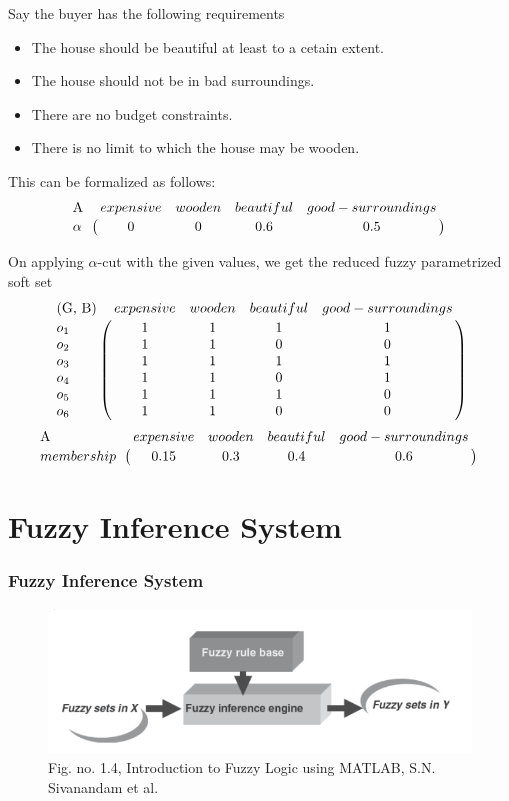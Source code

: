 \documentclass{beamer}
\begin{document}
  \begin{frame}
    Say the buyer has the following requirements
  \begin{itemize}
    \item The house should be beautiful at least to a cetain extent.
    \item The house should not be in bad surroundings.
    \item There are no budget constraints.
    \item There is no limit to which the house may be wooden.
  \end{itemize}
  This can be formalized as follows: 
  $$\bordermatrix{
  \text{A} &  expensive & wooden & beautiful & good-surroundings\cr
  \alpha & 0 & 0 & 0.6 & 0.5 }$$
  \end{frame}
  
  \begin{frame}
  On applying $\alpha$-cut with the given values, we get the reduced fuzzy parametrized soft set
  $$\bordermatrix{
  \text{(G, B)} & expensive & wooden & beautiful & good-surroundings \cr
  o_1 & 1 & 1 & 1 & 1 \cr
  o_2 &1 & 1 & 0 & 0 \cr
  o_3 &1 & 1 & 1 & 1 \cr
  o_4 &1 & 1 & 0 & 1 \cr
  o_5 &1 & 1 & 1 & 0 \cr
  o_6 &1 & 1 & 0 & 0}$$
  $$\bordermatrix{
  \text{A} & expensive & wooden & beautiful & good-surroundings\cr
  membership & 0.15 & 0.3 & 0.4 & 0.6 }$$
  \end{frame}
 
 
 \section{Fuzzy Inference System}
 \begin{frame}
 \frametitle{Fuzzy Inference System}
\begin{figure}[htp]
\centering
\includegraphics[scale=.40]{rbs.png}
\caption{Fig. no. 1.4, Introduction to Fuzzy
Logic using MATLAB, S.N. Sivanandam et al.}
\label{}
\end{figure}
 \end{frame}
\end{document}
